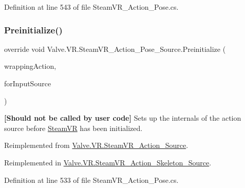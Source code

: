 Definition at line 543 of file Steam\+V\+R\+\_\+\+Action\+\_\+\+Pose.\+cs.

\mbox{\label{class_valve_1_1_v_r_1_1_steam_v_r___action___pose___source_a2e4aacdbfb9d1a2c5edffcd42e2c3c0e}} 
\subsubsection{\texorpdfstring{Preinitialize()}{Preinitialize()}}
{\footnotesize\ttfamily override void Valve.\+V\+R.\+Steam\+V\+R\+\_\+\+Action\+\_\+\+Pose\+\_\+\+Source.\+Preinitialize (\begin{DoxyParamCaption}\item[{\mbox{\hyperlink{class_valve_1_1_v_r_1_1_steam_v_r___action}{Steam\+V\+R\+\_\+\+Action}}}]{wrapping\+Action,  }\item[{\mbox{\hyperlink{namespace_valve_1_1_v_r_a82e5bf501cc3aa155444ee3f0662853f}{Steam\+V\+R\+\_\+\+Input\+\_\+\+Sources}}}]{for\+Input\+Source }\end{DoxyParamCaption})\hspace{0.3cm}{\ttfamily [virtual]}}



{\bfseries{\mbox{[}Should not be called by user code\mbox{]}}} Sets up the internals of the action source before \mbox{\hyperlink{class_valve_1_1_v_r_1_1_steam_v_r}{Steam\+VR}} has been initialized. 



Reimplemented from \mbox{\hyperlink{class_valve_1_1_v_r_1_1_steam_v_r___action___source_aa2bec7f32b37595de01f1456a3fa5bfe}{Valve.\+V\+R.\+Steam\+V\+R\+\_\+\+Action\+\_\+\+Source}}.



Reimplemented in \mbox{\hyperlink{class_valve_1_1_v_r_1_1_steam_v_r___action___skeleton___source_a8341927740ab2699476e66d08d3124d3}{Valve.\+V\+R.\+Steam\+V\+R\+\_\+\+Action\+\_\+\+Skeleton\+\_\+\+Source}}.



Definition at line 533 of file Steam\+V\+R\+\_\+\+Action\+\_\+\+Pose.\+cs.

\mbox{\label{class_valve_1_1_v_r_1_1_steam_v_r___action___pose___source_aa488ac2a5021efb184e4b335188944e4}} 
